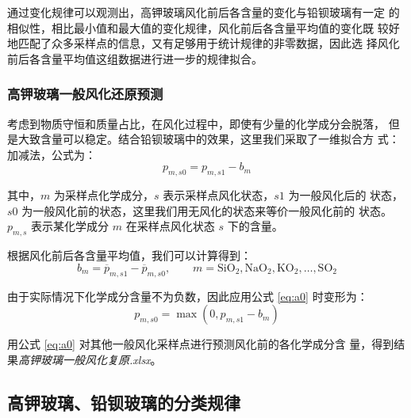 \documentclass[withoutpreface,bwprint]{cumcmthesis} %
\begin{document}
通过变化规律可以观测出，高钾玻璃风化前后各含量的变化与铅钡玻璃有一定
的相似性，相比最小值和最大值的变化规律，风化前后各含量平均值的变化既
较好地匹配了众多采样点的信息，又有足够用于统计规律的非零数据，因此选
择风化前后各含量平均值这组数据进行进一步的规律拟合。

\subsubsection{高钾玻璃一般风化还原预测}
考虑到物质守恒和质量占比，在风化过程中，即使有少量的化学成分会脱落，
但是大致含量可以稳定。结合铅钡玻璃中的效果，这里我们采取了一维拟合方
式：加减法，公式为：
\begin{equation}
    p_{m,s0}=p_{m,s1}-b_m
    \label{eq:a0}
\end{equation}

其中，$m$ 为采样点化学成分，$s$ 表示采样点风化状态，$s1$ 为一般风化后的
状态，$s0$ 为一般风化前的状态，这里我们用无风化的状态来等价一般风化前的
状态。$p_{m,s}$ 表示某化学成分 $m$ 在采样点风化状态 $s$ 下的含量。

根据风化前后各含量平均值，我们可以计算得到：
\begin{equation}
    b_m = \overline{p}_{m,s1}-\overline{p}_{m,s0},\qquad 
    m=\mathrm{SiO_2,NaO_2,KO_2,\dots,SO_2}
    \label{eq:a1}
\end{equation}

由于实际情况下化学成分含量不为负数，因此应用公式 \eqref{eq:a0} 时变形为：
\[
    p_{m,s0}=\max(0,p_{m,s1}-b_m)
\]

用公式 \eqref{eq:a0} 对其他一般风化采样点进行预测风化前的各化学成分含
量，得到结果\emph{高钾玻璃一般风化复原.xlsx}。


\subsection{高钾玻璃、铅钡玻璃的分类规律}
\end{document}
